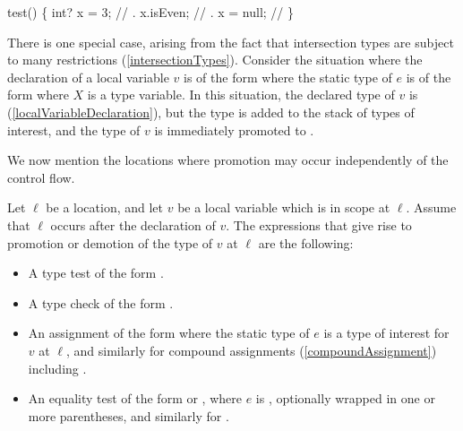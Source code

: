 \documentclass[makeidx]{article}
\begin{document}
{

\begin{dartCode}
\VOID test() \{
  int? x = 3; // .
  x.isEven; // .
  x = null; // 
\}
\end{dartCode}

\LMHash{}%
There is one special case,
arising from the fact that intersection types
are subject to many restrictions
(\ref{intersectionTypes}).
Consider the situation
where the declaration of a local variable $v$ is of the form
where the static type of $e$ is of the form 
where $X$ is a type variable.
In this situation, the declared type of $v$ is 
(\ref{localVariableDeclaration}),
but the type  is added to the stack of types of interest,
and the type of $v$ is immediately promoted to .


\LMHash{}%
We now mention the locations where promotion may occur
independently of the control flow.


\LMHash{}%
%
Let $\ell$ be a location,
and let $v$ be a local variable which is in scope at $\ell$.
Assume that $\ell$ occurs after the declaration of $v$.
The expressions that give rise to promotion or demotion
of the type of $v$ at $\ell$
are the following:

\begin{itemize}
\item A type test of the form .
\item A type check of the form .
\item An assignment of the form 
  where the static type of $e$ is a type of interest for $v$ at $\ell$,
  and similarly for compound assignments
  (\ref{compoundAssignment})
  including .
\item An equality test of the form  or
  , where $e$ is \NULL,
  optionally wrapped in one or more parentheses,
  and similarly for \lit{!=}.
\end{itemize}

}
\end{document}
